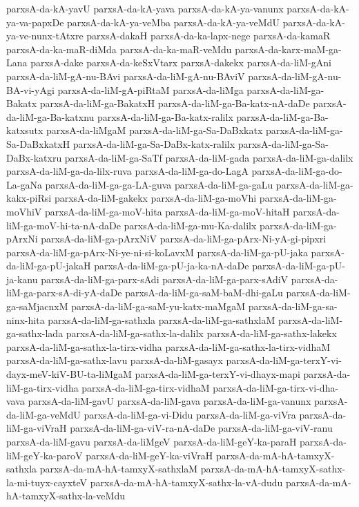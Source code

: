 {parxsA-da-kA-yavU
parxsA-da-kA-yava
parxsA-da-kA-ya-vanunx
parxsA-da-kA-ya-va-papxDe
parxsA-da-kA-ya-veMba
parxsA-da-kA-ya-veMdU
parxsA-da-kA-ya-ve-nunx-tAtxre
parxsA-dakaH
parxsA-da-ka-lapx-nege
parxsA-da-kamaR
parxsA-da-ka-maR-diMda
parxsA-da-ka-maR-veMdu
parxsA-da-karx-maM-ga-Lana
parxsA-dake
parxsA-da-keSxVtarx
parxsA-dakekx
parxsA-da-liM-gAni
parxsA-da-liM-gA-nu-BAvi
parxsA-da-liM-gA-nu-BAviV
parxsA-da-liM-gA-nu-BA-vi-yAgi
parxsA-da-liM-gA-piRtaM
parxsA-da-liMga
parxsA-da-liM-ga-Bakatx
parxsA-da-liM-ga-BakatxH
parxsA-da-liM-ga-Ba-katx-nA-daDe
parxsA-da-liM-ga-Ba-katxnu
parxsA-da-liM-ga-Ba-katx-ralilx
parxsA-da-liM-ga-Ba-katxsutx
parxsA-da-liMgaM
parxsA-da-liM-ga-Sa-DaBxkatx
parxsA-da-liM-ga-Sa-DaBxkatxH
parxsA-da-liM-ga-Sa-DaBx-katx-ralilx
parxsA-da-liM-ga-Sa-DaBx-katxru
parxsA-da-liM-ga-SaTf
parxsA-da-liM-gada
parxsA-da-liM-ga-dalilx
parxsA-da-liM-ga-da-lilx-ruva
parxsA-da-liM-ga-do-LagA
parxsA-da-liM-ga-do-La-gaNa
parxsA-da-liM-ga-ga-LA-guva
parxsA-da-liM-ga-gaLu
parxsA-da-liM-ga-kakx-piRsi
parxsA-da-liM-gakekx
parxsA-da-liM-ga-moVhi
parxsA-da-liM-ga-moVhiV
parxsA-da-liM-ga-moV-hita
parxsA-da-liM-ga-moV-hitaH
parxsA-da-liM-ga-moV-hi-ta-nA-daDe
parxsA-da-liM-ga-mu-Ka-dalilx
parxsA-da-liM-ga-pArxNi
parxsA-da-liM-ga-pArxNiV
parxsA-da-liM-ga-pArx-Ni-yA-gi-pipxri
parxsA-da-liM-ga-pArx-Ni-ye-ni-si-koLavxM
parxsA-da-liM-ga-pU-jaka
parxsA-da-liM-ga-pU-jakaH
parxsA-da-liM-ga-pU-ja-ka-nA-daDe
parxsA-da-liM-ga-pU-ja-kanu
parxsA-da-liM-ga-parx-sAdi
parxsA-da-liM-ga-parx-sAdiV
parxsA-da-liM-ga-parx-sA-di-yA-daDe
parxsA-da-liM-ga-saM-baM-dhi-gaLu
parxsA-da-liM-ga-saMjacnxM
parxsA-da-liM-ga-saM-yu-katx-maMgaM
parxsA-da-liM-ga-sa-ninx-hita
parxsA-da-liM-ga-sathxla
parxsA-da-liM-ga-sathxlaM
parxsA-da-liM-ga-sathx-lada
parxsA-da-liM-ga-sathx-la-dalilx
parxsA-da-liM-ga-sathx-lakekx
parxsA-da-liM-ga-sathx-la-tirx-vidha
parxsA-da-liM-ga-sathx-la-tirx-vidhaM
parxsA-da-liM-ga-sathx-lavu
parxsA-da-liM-gasayx
parxsA-da-liM-ga-terxY-vi-dayx-meV-kiV-BU-ta-liMgaM
parxsA-da-liM-ga-terxY-vi-dhayx-mapi
parxsA-da-liM-ga-tirx-vidha
parxsA-da-liM-ga-tirx-vidhaM
parxsA-da-liM-ga-tirx-vi-dha-vava
parxsA-da-liM-gavU
parxsA-da-liM-gava
parxsA-da-liM-ga-vanunx
parxsA-da-liM-ga-veMdU
parxsA-da-liM-ga-vi-Didu
parxsA-da-liM-ga-viVra
parxsA-da-liM-ga-viVraH
parxsA-da-liM-ga-viV-ra-nA-daDe
parxsA-da-liM-ga-viV-ranu
parxsA-da-liM-gavu
parxsA-da-liMgeV
parxsA-da-liM-geY-ka-paraH
parxsA-da-liM-geY-ka-paroV
parxsA-da-liM-geY-ka-viVraH
parxsA-da-mA-hA-tamxyX-sathxla
parxsA-da-mA-hA-tamxyX-sathxlaM
parxsA-da-mA-hA-tamxyX-sathx-la-mi-tuyx-cayxteV
parxsA-da-mA-hA-tamxyX-sathx-la-vA-dudu
parxsA-da-mA-hA-tamxyX-sathx-la-veMdu
}

